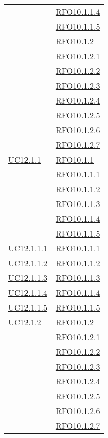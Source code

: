 \begin{longtable}{|>{\centering}m{5cm}|m{5cm}<{\centering}|}
& \hyperlink{RFO10.1.1.4}{RFO10.1.1.4}\\
& \hyperlink{RFO10.1.1.5}{RFO10.1.1.5}\\
& \hyperlink{RFO10.1.2}{RFO10.1.2}\\
& \hyperlink{RFO10.1.2.1}{RFO10.1.2.1}\\
& \hyperlink{RFO10.1.2.2}{RFO10.1.2.2}\\
& \hyperlink{RFO10.1.2.3}{RFO10.1.2.3}\\
& \hyperlink{RFO10.1.2.4}{RFO10.1.2.4}\\
& \hyperlink{RFO10.1.2.5}{RFO10.1.2.5}\\
& \hyperlink{RFO10.1.2.6}{RFO10.1.2.6}\\
& \hyperlink{RFO10.1.2.7}{RFO10.1.2.7}\\\hline
\hyperlink{UC12.1.1}{UC12.1.1} & \hyperlink{RFO10.1.1}{RFO10.1.1}\\
& \hyperlink{RFO10.1.1.1}{RFO10.1.1.1}\\
& \hyperlink{RFO10.1.1.2}{RFO10.1.1.2}\\
& \hyperlink{RFO10.1.1.3}{RFO10.1.1.3}\\
& \hyperlink{RFO10.1.1.4}{RFO10.1.1.4}\\
& \hyperlink{RFO10.1.1.5}{RFO10.1.1.5}\\\hline
\hyperlink{UC12.1.1.1}{UC12.1.1.1} & \hyperlink{RFO10.1.1.1}{RFO10.1.1.1}\\\hline
\hyperlink{UC12.1.1.2}{UC12.1.1.2} & \hyperlink{RFO10.1.1.2}{RFO10.1.1.2}\\\hline
\hyperlink{UC12.1.1.3}{UC12.1.1.3} & \hyperlink{RFO10.1.1.3}{RFO10.1.1.3}\\\hline
\hyperlink{UC12.1.1.4}{UC12.1.1.4} & \hyperlink{RFO10.1.1.4}{RFO10.1.1.4}\\\hline
\hyperlink{UC12.1.1.5}{UC12.1.1.5} & \hyperlink{RFO10.1.1.5}{RFO10.1.1.5}\\\hline
\hyperlink{UC12.1.2}{UC12.1.2} & \hyperlink{RFO10.1.2}{RFO10.1.2}\\
& \hyperlink{RFO10.1.2.1}{RFO10.1.2.1}\\
& \hyperlink{RFO10.1.2.2}{RFO10.1.2.2}\\
& \hyperlink{RFO10.1.2.3}{RFO10.1.2.3}\\
& \hyperlink{RFO10.1.2.4}{RFO10.1.2.4}\\
& \hyperlink{RFO10.1.2.5}{RFO10.1.2.5}\\
& \hyperlink{RFO10.1.2.6}{RFO10.1.2.6}\\
& \hyperlink{RFO10.1.2.7}{RFO10.1.2.7}\\\hline

\end{longtable}
